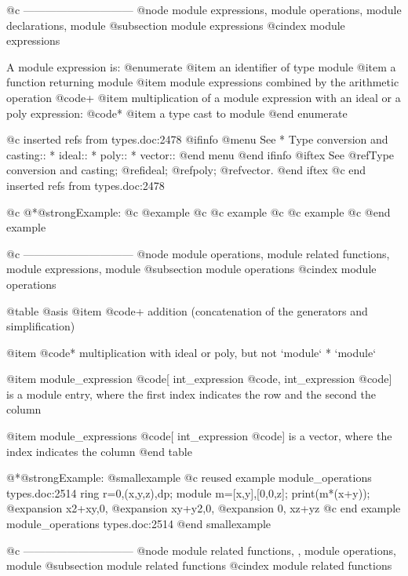 {{{{{{@c ------------------------------
@node module expressions, module operations, module declarations, module
@subsection module expressions
@cindex module expressions

A module expression is:
@enumerate
@item
an identifier of type module
@item
a function returning module
@item
module expressions combined by the arithmetic operation @code{+}
@item
multiplication of a module expression with an ideal or a poly expression: @code{*}
@item
a type cast to module
@end enumerate

@c inserted refs from types.doc:2478
@ifinfo
@menu
See
* Type conversion and casting::
* ideal::
* poly::
* vector::
@end menu
@end ifinfo
@iftex
See
@ref{Type conversion and casting};
@ref{ideal};
@ref{poly};
@ref{vector}.
@end iftex
@c end inserted refs from types.doc:2478

@c @*@strong{Example:}
@c @example
@c @c example
@c @c example
@c @end example

@c ------------------------------
@node module operations, module related functions, module expressions, module
@subsection module operations
@cindex module operations

@table @asis
@item @code{+}
addition (concatenation of the generators and simplification)

@item @code{*}
multiplication with ideal or poly, but not `module` * `module`

@item module_expression @code{[} int_expression @code{,} int_expression @code{]}
is a module entry, where the first index indicates the row and
the second the column

@item module_expressions @code{[} int_expression @code{]}
is a vector, where the index indicates the column
@end table

@*@strong{Example:}
@smallexample
@c reused example module_operations types.doc:2514 
  ring r=0,(x,y,z),dp;
  module m=[x,y],[0,0,z];
  print(m*(x+y));
@expansion{} x2+xy,0,   
@expansion{} xy+y2,0,   
@expansion{} 0,    xz+yz
@c end example module_operations types.doc:2514
@end smallexample

@c ------------------------------
@node module related functions,  , module operations, module
@subsection module related functions
@cindex module related functions

}}}}}}
